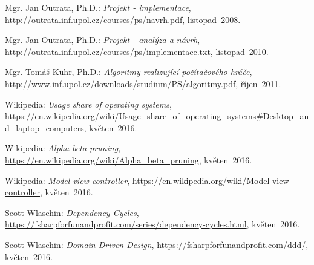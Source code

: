 \documentclass[12pt]{article}
\begin{document}
\newpage
\begin{thebibliography}{10}
	
 Mgr. Jan Outrata, Ph.D.: \emph{Projekt - implementace},
 \url{http://outrata.inf.upol.cz/courses/ps/navrh.pdf},
			listopad~2008.

	
 Mgr. Jan Outrata, Ph.D.: \emph{Projekt - analýza a návrh},
 \url{http://outrata.inf.upol.cz/courses/ps/implementace.txt},
			listopad~2010.

 Mgr. Tomáš Kühr, Ph.D.: \emph{Algoritmy realizující počítačového hráče},
 \url{http://www.inf.upol.cz/downloads/studium/PS/algoritmy.pdf},
			říjen~2011.

Wikipedia: \emph{Usage share of operating systems},
 \url{https://en.wikipedia.org/wiki/Usage_share_of_operating_systems#Desktop_and_laptop_computers},
			květen~2016.

Wikipedia: \emph{Alpha-beta pruning},
 \url{https://en.wikipedia.org/wiki/Alpha_beta_pruning},
			květen~2016.

Wikipedia: \emph{Model-view-controller},
 \url{https://en.wikipedia.org/wiki/Model-view-controller},
			květen~2016.


Scott Wlaschin: \emph{Dependency Cycles},
 \url{https://fsharpforfunandprofit.com/series/dependency-cycles.html},
			květen~2016.

Scott Wlaschin: \emph{Domain Driven Design},
 \url{https://fsharpforfunandprofit.com/ddd/},
			květen~2016.

\end{thebibliography} 
\end{document}
